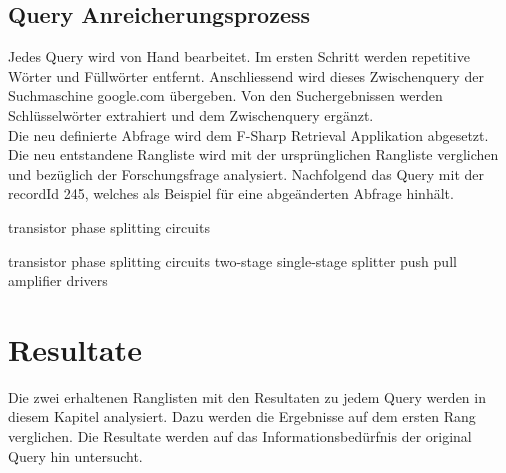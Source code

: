 \documentclass[a4paper, 10pt, ngerman, fleqn]{article}
\begin{document}
\subsection{Query Anreicherungsprozess}
Jedes Query wird von Hand bearbeitet. Im ersten Schritt werden repetitive Wörter und Füllwörter entfernt. Anschliessend wird dieses Zwischenquery der Suchmaschine google.com übergeben. Von den Suchergebnissen werden Schlüsselwörter extrahiert und dem Zwischenquery ergänzt.\\
Die neu definierte Abfrage wird dem F-Sharp Retrieval Applikation abgesetzt. Die neu entstandene Rangliste wird mit der ursprünglichen Rangliste verglichen und bezüglich der Forschungsfrage analysiert.
Nachfolgend das Query mit der recordId 245, welches als Beispiel für eine abgeänderten Abfrage hinhält.\\

\begin{description}[\setlabelstyle{\bfseries}\setleftmargin{9em}]
	\item[original]
	transistor phase splitting circuits
	
	\item[angereichert]
	transistor phase splitting circuits two-stage single-stage splitter push pull amplifier drivers
\end{description}
 
\section{Resultate}
Die zwei erhaltenen Ranglisten mit den Resultaten zu jedem Query werden in diesem Kapitel analysiert. Dazu werden die Ergebnisse auf dem ersten Rang verglichen. Die Resultate werden auf das Informationsbedürfnis der original Query hin untersucht.
\end{document}
